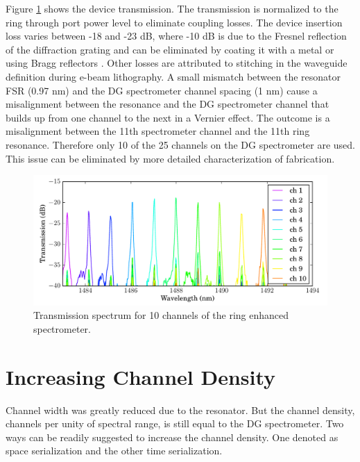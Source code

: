 \documentclass[12pt,twoside,english]{book}
\renewcommand{\~}{\perispomeni}%
\numberwithin{equation}{section}
\numberwithin{figure}{section}
\begin{document}
Figure \ref{fig:RES spectrum} shows the device transmission. The transmission is normalized to the ring through port power level to eliminate coupling losses. The device insertion loss varies between -18 and -23 dB, where -10 dB is due to the Fresnel reflection of the diffraction grating and can be eliminated by coating it with a metal or using Bragg reflectors \cite{Brouckaert:2008p108}. Other losses are attributed to stitching in the waveguide definition during e-beam lithography. A small mismatch between the resonator FSR (0.97 nm) and the DG spectrometer channel spacing (1 nm) cause a misalignment between the resonance and the DG spectrometer channel that builds up from one channel to the next in a Vernier effect. The outcome is a misalignment between the 11th spectrometer channel and the 11th ring resonance. Therefore only 10 of the 25 channels on the DG spectrometer are used. This issue can be eliminated by more detailed characterization of fabrication.%
\begin{figure}[h] \noindent \begin{centering}
\includegraphics{graphs/low-density-ring-enhanced}
\par\end{centering}
\caption{Transmission spectrum for 10 channels of the ring enhanced spectrometer.\label{fig:RES spectrum}}
\end{figure} 


\section{Increasing Channel Density}

Channel width was greatly reduced due to the resonator. But the channel density, channels per unity of spectral range, is still equal to the DG spectrometer. Two ways can be readily suggested to increase the channel density. One denoted as space serialization and the other time serialization. 
\end{document}
